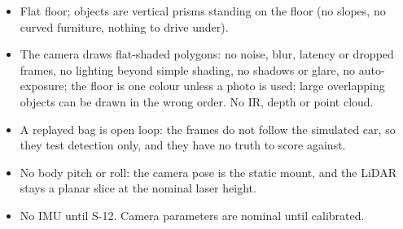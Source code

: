 \documentclass[11pt,a4paper]{article}
\begin{document}
\begin{itemize}
  \item Flat floor; objects are vertical prisms standing on the floor (no slopes, no curved furniture, nothing to drive under).
  \item The camera draws flat-shaded polygons: no noise, blur, latency or dropped frames, no lighting beyond simple shading, no shadows or glare, no auto-exposure; the floor is one colour unless a photo is used; large overlapping objects can be drawn in the wrong order. No IR, depth or point cloud.
  \item A replayed bag is open loop: the frames do not follow the simulated car, so they test detection only, and they have no truth to score against.
  \item No body pitch or roll: the camera pose is the static mount, and the LiDAR stays a planar slice at the nominal laser height.
  \item No IMU until S-12. Camera parameters are nominal until calibrated.
\end{itemize}

\end{document}
